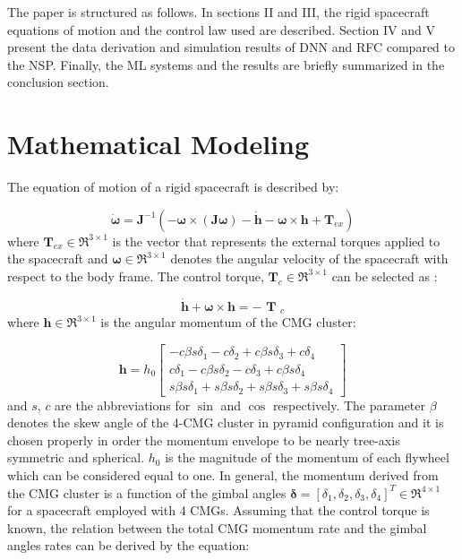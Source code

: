 \documentclass[aerospace,article,submit,moreauthors,dvi2pdf]{Definitions/mdpi}
\begin{document}
The paper is structured as follows. In sections II and III, the rigid spacecraft equations of motion and the control law used are described. Section IV and V present the data derivation and simulation results of DNN and RFC compared to the NSP. Finally, the ML systems and the results are briefly summarized in the conclusion section.
 
\section{Mathematical Modeling}
The equation of motion of a rigid spacecraft is described by:

\begin{equation}
\dot{\boldsymbol{\omega}}=\textbf{J}^{-1}(-\boldsymbol{\omega}\times(\textbf{J}\boldsymbol{\omega})-\dot{\textbf{h}}-\boldsymbol{\omega}\times \textbf{h} + \textbf{T}_{ex})
\label{eq:dyn_eq}
\end{equation}
where $\textbf{T}_{ex} \in { \Re  }^{ 3\times1}$ is the vector that represents the external torques applied to the spacecraft and $\boldsymbol{\omega} \in {\Re}^{3\times1}$ denotes the angular velocity of the spacecraft with respect to the body frame. The control torque, $\textbf{T}_c  \in {\Re}^{3\times1}$ can be selected as \cite{lappasthesis}:

\begin{equation}
\dot { \textbf{h} } +\boldsymbol{\omega}\times \textbf{h}=-\textbf{ T }_c
\label{eq:control}
\end{equation}
where $ \textbf{h}\in\Re^{3\times1}$ is the angular momentum of the CMG cluster:

\begin{equation}
\textbf{h}=h_0
\begin{bmatrix}
-c\beta s\delta_1-c\delta_2+c\beta s\delta_3+c\delta_4 \\
c\delta_1 -c\beta s\delta_2 -c\delta_3 +c\beta s\delta_4 \\
s\beta s\delta_1+s\beta s\delta_2+s\beta s\delta_3+s\beta s\delta_4
\end{bmatrix}  
\end{equation}
and $s$, $c$ are the abbreviations for $\sin$ and $\cos$ respectively.  The parameter $\beta$ denotes the skew angle of the 4-CMG cluster in pyramid configuration and it is chosen properly in order the momentum envelope to be nearly tree-axis symmetric and spherical. $h_0$ is the magnitude of the momentum of each flywheel which can be considered equal to one.
In general, the momentum derived from the CMG cluster is a function of the gimbal angles $\boldsymbol{\delta}=[\delta_1, \delta_2,\delta_3, \delta_4]^T\in\Re^{4\times1}$ for a spacecraft employed with 4 CMGs. Assuming that the control torque is known, the relation between the total CMG momentum rate and the gimbal angles rates  can be derived by the equation:
\end{document}
